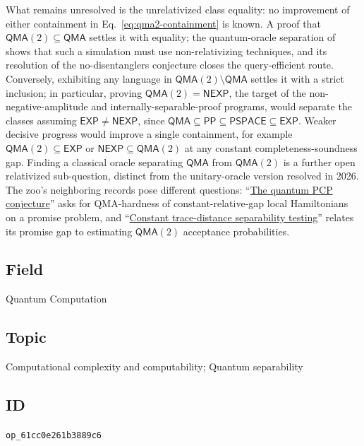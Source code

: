 What remains unresolved is the unrelativized class equality: no improvement
of either containment in Eq.~\eqref{eq:qma2-containment} is known.  A proof
that $\mathsf{QMA}(2) \subseteq \mathsf{QMA}$ settles it with equality; the
quantum-oracle separation of  shows that
such a simulation must use non-relativizing techniques, and its resolution
of the no-disentanglers conjecture closes the query-efficient route.
Conversely, exhibiting any language in
$\mathsf{QMA}(2) \setminus \mathsf{QMA}$ settles it with a strict
inclusion; in particular, proving $\mathsf{QMA}(2) = \mathsf{NEXP}$, the
target of the non-negative-amplitude and internally-separable-proof
programs, would separate the classes assuming
$\mathsf{EXP} \ne \mathsf{NEXP}$, since $\mathsf{QMA} \subseteq \mathsf{PP}
\subseteq \mathsf{PSPACE} \subseteq \mathsf{EXP}$.  Weaker decisive
progress would improve a single containment, for example
$\mathsf{QMA}(2) \subseteq \mathsf{EXP}$ or
$\mathsf{NEXP} \subseteq \mathsf{QMA}(2)$ at any constant
completeness-soundness gap.  Finding a classical oracle separating
$\mathsf{QMA}$ from $\mathsf{QMA}(2)$ is a further open relativized
sub-question, distinct from the unitary-oracle version resolved in 2026.
The zoo's neighboring records pose different questions: ``\href{https://qiqc-op.com/problem/op_bca77ec42ddd1d5c/}{The quantum PCP conjecture}'' asks for QMA-hardness of constant-relative-gap local
Hamiltonians on a promise problem, and ``\href{https://qiqc-op.com/problem/op_ec184fc49232a9c0/}{Constant trace-distance separability testing}'' relates its promise gap to estimating
$\mathsf{QMA}(2)$ acceptance probabilities.

\subsection*{Field}

Quantum Computation

\subsection*{Topic}

Computational complexity and computability; Quantum separability

\subsection*{ID}

\texttt{op\_61cc0e261b3889c6}
